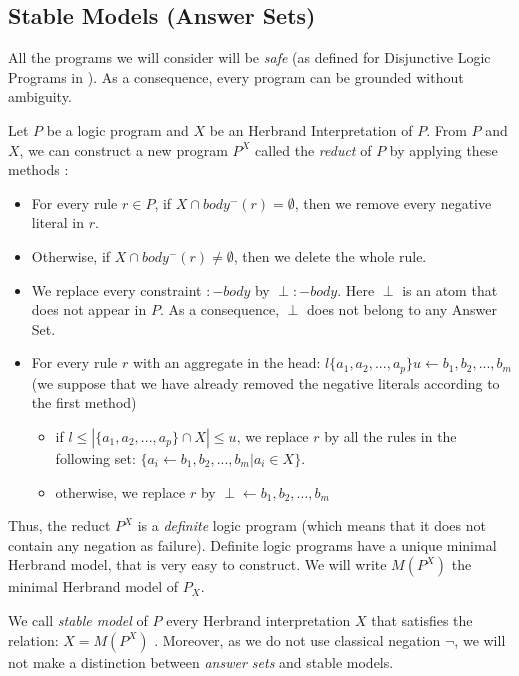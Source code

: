 \subsection{Stable Models (Answer Sets)}

All the programs we will consider will be \textit{safe} (as defined for Disjunctive Logic Programs in \citep{dlp_safe}). As a consequence, every program can be grounded without ambiguity.

\bigskip

Let $P$ be a logic program and $X$ be an Herbrand Interpretation of $P$. From $P$ and $X$, we can construct a new program $P^X$ called the \textit{reduct} of $P$ by applying these methods \citep{stable_semantics, law_simplified}:
\begin{itemize}
\item For every rule $r\in P$, if $X\cap body^-(r)=\emptyset$, then we remove every negative literal in $r$.
\item Otherwise, if $X\cap body^-(r)\neq\emptyset$, then we delete the whole rule.
\item We replace every constraint $ :- body$ by $\perp :- body$. Here $\perp$ is an atom that does not appear in $P$. As a consequence, $\perp$ does not belong to any Answer Set.
\item For every rule $r$ with an aggregate in the head: $l\{a_1, a_2, ..., a_p\}u \leftarrow b_1, b_2, ..., b_m$ (we suppose that we have already removed the negative literals according to the first method)
\begin{itemize}
\item if $l \leq |\{a_1, a_2, ..., a_p\}\cap X | \leq u$, we replace $r$ by all the rules in the following set: $\{ a_i \leftarrow b_1, b_2, ..., b_m | a_i \in X\}$.
\item otherwise, we replace $r$ by $\perp \leftarrow b_1, b_2, ..., b_m$
\end{itemize}
\end{itemize}

Thus, the reduct $P^X$ is a \textit{definite} logic program (which means that it does not contain any negation as failure). Definite logic programs have a unique minimal Herbrand \citep{sergot_minimal} model, that is very easy to construct. We will write $M(P^X)$ the minimal Herbrand model of $P_X$.

\smallskip

We call \textit{stable model} of $P$ every Herbrand interpretation $X$ that satisfies the relation: $X=M(P^X)$ \citep{sergot_stable_model}. Moreover, as we do not use classical negation $\neg$, we will not make a distinction between \textit{answer sets} and stable models.


